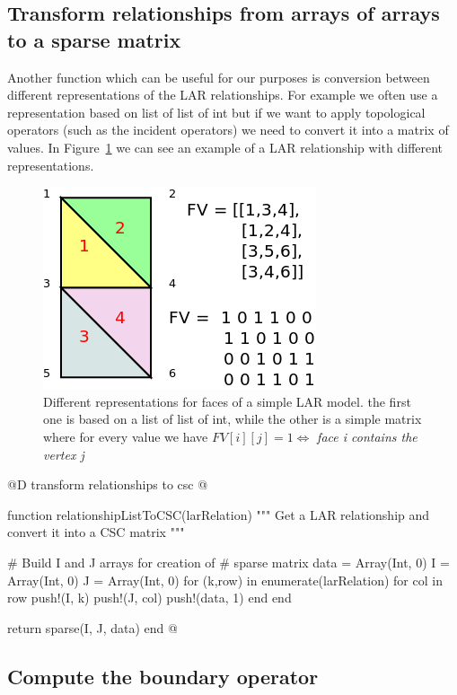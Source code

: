 \documentclass[11pt,oneside]{article}	%
\begin{document}
\subsection{Transform relationships from arrays of arrays to a sparse matrix}\label{sec:transformSparse}

Another function which can be useful for our purposes is conversion between different representations of the LAR relationships. For example we often use a representation based on list of list of int but if we want to apply topological operators (such as the incident operators) we need to convert it into a matrix of values. In Figure~\ref{fig:LARRepresentations} we can see an example of a LAR relationship with different representations.

\begin{figure}[htb] %
   \centering
   \includegraphics[width=0.45\linewidth]{images/LARRepresentations.png}
   \caption{Different representations for faces of a simple LAR model. the first one is based on a list of list of int, while the other is a simple matrix where for every value we have $FV[i][j] = 1 \iff $ \textit{face i contains the vertex j} }
   \label{fig:LARRepresentations}
\end{figure}

@D transform relationships to csc
@{function relationshipListToCSC(larRelation)
  """
  Get a LAR relationship
  and convert it into a CSC matrix
  """

  # Build I and J arrays for creation of
  # sparse matrix
  data = Array(Int, 0)
  I = Array(Int, 0)
  J = Array(Int, 0)
  for (k,row) in enumerate(larRelation)
    for col in row
      push!(I, k)
      push!(J, col)
      push!(data, 1)
    end
  end

  return sparse(I, J, data)
end @}

\subsection{Compute the boundary operator}\label{sec:JuliaBoundaryOperator}
\end{document}
